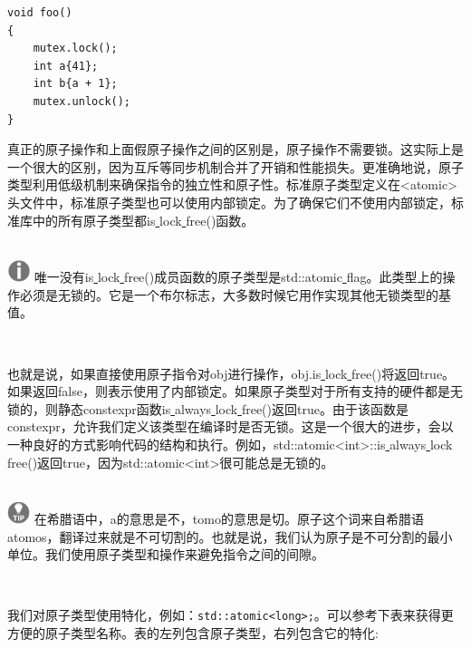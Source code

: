\begin{lstlisting}[caption={}]
void foo()
{
	mutex.lock();
	int a{41};
	int b{a + 1};
	mutex.unlock();
}
\end{lstlisting}

真正的原子操作和上面假原子操作之间的区别是，原子操作不需要锁。这实际上是一个很大的区别，因为互斥等同步机制合并了开销和性能损失。更准确地说，原子类型利用低级机制来确保指令的独立性和原子性。标准原子类型定义在<atomic>头文件中，标准原子类型也可以使用内部锁定。为了确保它们不使用内部锁定，标准库中的所有原子类型都is\underline{ }lock\underline{ }free()函数。 \par

\hspace*{\fill} \\ %
\includegraphics[width=0.05\textwidth]{images/warn}
唯一没有is\underline{ }lock\underline{ }free()成员函数的原子类型是std::atomic\underline{ }flag。此类型上的操作必须是无锁的。它是一个布尔标志，大多数时候它用作实现其他无锁类型的基值。 \par
\noindent\textbf{}\ \par

也就是说，如果直接使用原子指令对obj进行操作，obj.is\underline{ }lock\underline{ }free()将返回true。如果返回false，则表示使用了内部锁定。如果原子类型对于所有支持的硬件都是无锁的，则静态constexpr函数is\underline{ }always\underline{ }lock\underline{ }free()返回true。由于该函数是constexpr，允许我们定义该类型在编译时是否无锁。这是一个很大的进步，会以一种良好的方式影响代码的结构和执行。例如，std::atomic<int>::is\underline{ }always\underline{ }lock\underline{ }free()返回true，因为std::atomic<int>很可能总是无锁的。 \par

\hspace*{\fill} \\ %
\includegraphics[width=0.05\textwidth]{images/tip}
在希腊语中，a的意思是不，tomo的意思是切。原子这个词来自希腊语atomos，翻译过来就是不可切割的。也就是说，我们认为原子是不可分割的最小单位。我们使用原子类型和操作来避免指令之间的间隙。 \par
\noindent\textbf{}\ \par

我们对原子类型使用特化，例如：\texttt{std::atomic<long>;}。可以参考下表来获得更方便的原子类型名称。表的左列包含原子类型，右列包含它的特化: \par

